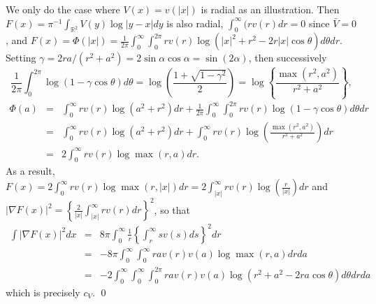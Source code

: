 \documentclass[final]{amsart}
\theoremstyle{definition}
\numberwithin{equation}{section}
\def\disp{\displaystyle}
\newcommand{\dR}{\ensuremath{\mathbb{R}}}
\begin{document}
We only do the case where $V(x) = v(|x|)$ is radial as an illustration. Then $F(x) = \pi^{-1}\int_{\dR^2}V(y) \log|y-x|dy$ is also radial, $\int_0^\infty(r v(r)dr = 0$ since $\bar V=0$, and
$\disp
F(x) = \Phi(|x|) = \frac{1}{2\pi}\int_0^\infty \int_0^{2\pi} r v(r) \log\left(|x|^2+r^2-2r|x|\cos\theta\right)d\theta dr$.
Setting $\gamma = 2ra/(r^2+a^2) = 2\sin\alpha\cos\alpha=\sin(2\alpha)$, then successively
$$
\frac{1}{2\pi}\int_0^{2\pi}  \log\left(1-\gamma\cos\theta \right)d\theta = \log\left(\frac{1+\sqrt{ 1-\gamma^2}}{2}\right) = \log\left\{\frac{\max\left(r^2,a^2\right)}{r^2+a^2}\right\},
$$
\begin{eqnarray*}
\Phi(a) &=& \int_0^\infty r v(r) \log\left(a^2+r^2\right)  dr
                  +  \frac{1}{2\pi}\int_0^\infty \int_0^{2\pi} r v(r) \log\left(1-\gamma\cos\theta \right)d\theta dr\\
&=& \int_0^\infty r v(r) \log\left(a^2+r^2\right)  dr + \int_0^\infty r v(r) \log\left(\frac{\max(r^2,a^2)}{r^2+a^2}\right)dr\\
&=& 2\int_0^\infty r v(r) \log{\max\left(r,a\right) }dr.
\end{eqnarray*}
As  a result,
$\disp
 F(x) = 2\int_0^\infty r v(r) \log{\max\left(r,|x|\right) }dr = 2 \int_{|x|}^\infty r v(r)\log\left(\frac{r}{|x|}\right) dr
 $
 and
$|\nabla F(x)|^2=\left\{\frac{2}{|x|}\int_{|x|}^\infty  r v(r) dr\right\}^2$, so that
\begin{eqnarray*}
\int |\nabla F(x)|^2 dx  &=& 8\pi \int_0^\infty \frac{1}{r}\left\{\int_r^\infty  sv(s)ds\right\}^2   dr\\
&=& -8\pi \int_0^\infty \int_0^\infty ra v(r)v(a) \log{\max(r,a)}drda\\
&=& -2 \int_0^\infty \int_0^\infty   \int_0^{2\pi}  ra v(r)v(a) \log{ \left(r^2+a^2-2ra \cos\theta \right) }d\theta drda
\end{eqnarray*}
which is precisely $c_V$.
\qed
%

\end{document}
